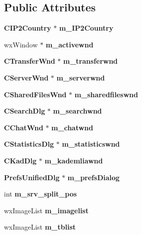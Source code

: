 \subsection*{Public Attributes}
\begin{DoxyCompactItemize}
\item 
{\bf CIP2Country} $\ast$ {\bfseries m\_\-IP2Country}\label{classCamuleDlg_af3772d07bacf8b076a11a6edd0bb2605}

\item 
wxWindow $\ast$ {\bfseries m\_\-activewnd}\label{classCamuleDlg_a77c14a36160b8d29d6c4db9d52b5a8d7}

\item 
{\bf CTransferWnd} $\ast$ {\bfseries m\_\-transferwnd}\label{classCamuleDlg_a255cc12207fe4093a86539d03d470543}

\item 
{\bf CServerWnd} $\ast$ {\bfseries m\_\-serverwnd}\label{classCamuleDlg_ae14ecd63ccdb0d5b1ca5c3d613a0d538}

\item 
{\bf CSharedFilesWnd} $\ast$ {\bfseries m\_\-sharedfileswnd}\label{classCamuleDlg_a6acc0b94466aa528a0aa2a0cbe73a1b0}

\item 
{\bf CSearchDlg} $\ast$ {\bfseries m\_\-searchwnd}\label{classCamuleDlg_ae68da5c00a3b6dee05a72d00d3d03405}

\item 
{\bf CChatWnd} $\ast$ {\bfseries m\_\-chatwnd}\label{classCamuleDlg_a918788805dd7bf5b0484419ef294d63b}

\item 
{\bf CStatisticsDlg} $\ast$ {\bfseries m\_\-statisticswnd}\label{classCamuleDlg_a71d4fc4ce65280f25fbe456d64a0c0a0}

\item 
{\bf CKadDlg} $\ast$ {\bfseries m\_\-kademliawnd}\label{classCamuleDlg_af8d25919a2c1431910247c07d573af71}

\item 
{\bf PrefsUnifiedDlg} $\ast$ {\bf m\_\-prefsDialog}\label{classCamuleDlg_a1258138da2e768085739525e03fc90a5}

\item 
int {\bfseries m\_\-srv\_\-split\_\-pos}\label{classCamuleDlg_afef13d5c027fc3b60bab1f97907a3b6f}

\item 
wxImageList {\bfseries m\_\-imagelist}\label{classCamuleDlg_a819c96cce61344d031f2450d02e1d65f}

\item 
wxImageList {\bfseries m\_\-tblist}\label{classCamuleDlg_af6ba167dcc6bbf4ae6cbd10a36b3c5ee}

\end{DoxyCompactItemize}
